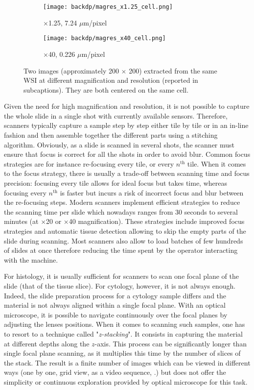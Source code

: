 \begin{figure}
  \centering
  \begin{subfigure}[t]{0.48\textwidth}
    \centering
    \texttt{[image: backdp/magres\_x1.25\_cell.png]}
    \caption{$\times$1.25, 7.24 $\mu$m/pixel}
  \end{subfigure}
  \begin{subfigure}[t]{0.47\textwidth}
    \centering
    \texttt{[image: backdp/magres\_x40\_cell.png]}
    \caption{$\times$40, 0.226 $\mu$m/pixel}
  \end{subfigure}
  \caption{Two images (approximately 200 $\times$ 200) extracted from the same WSI at different magnification and resolution (reported in subcaptions). They are both centered on the same cell.}
\end{figure}

Given the need for high magnification and resolution, it is not possible to capture the whole slide in a single shot with currently available sensors. Therefore, scanners typically capture a sample step by step either tile by tile or in an in-line fashion and then assemble together the different parts using a stitching algorithm. Obviously, as a slide is scanned in several shots, the scanner must ensure that focus is correct for all the shots in order to avoid blur. Common focus strategies are for instance re-focusing every tile, or every $n^{\text{th}}$ tile. When it comes to the focus strategy, there is usually a trade-off between scanning time and focus precision: focusing every tile allows for ideal focus but takes time, whereas focusing every $n^{\text{th}}$ is faster but incurs a risk of incorrect focus and blur between the re-focusing steps. Modern scanners implement efficient strategies to reduce the scanning time per slide which nowadays ranges from 30 seconds to several minutes (at $\times$20 or $\times$40 magnification). These strategies include improved focus strategies and automatic tissue detection allowing to skip the empty parts of the slide during scanning. Most scanners also allow to load batches of few hundreds of slides at once therefore reducing the time spent by the operator interacting with the machine.

For histology, it is usually sufficient for scanners to scan one focal plane of the slide (\ie that of the tissue slice). For cytology, however, it is not always enough. Indeed, the slide preparation process for a cytology sample differs and the material is not always aligned within a single focal plane. With an optical microscope, it is possible to navigate continuously over the focal planes by adjusting the lenses positions. When it comes to scanning such samples, one has to resort to a technique called "\textit{z-stacking}". It consists in capturing the material at different depths along the $z$-axis. This process can be significantly longer than single focal plane scanning, as it multiplies this time by the number of slices of the stack. The result is a finite number of images which can be viewed in different ways (\eg one by one, grid view, as a video sequence, \etc.) but does not offer the simplicity or continuous exploration provided by optical microscope for this task. 

